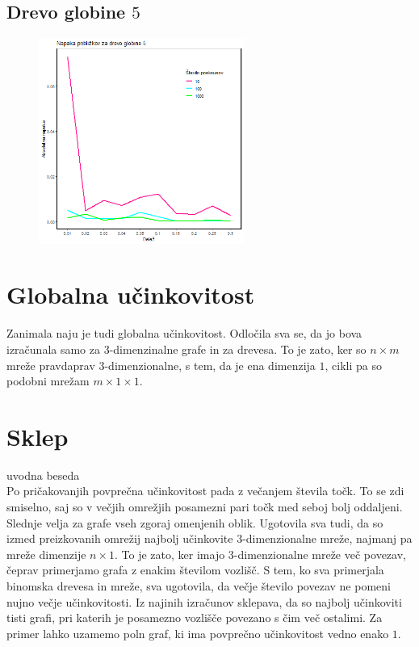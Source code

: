 \documentclass[a4paper, 16pt]{article}
\begin{document}
\newpage    
    \subsection{Drevo globine $5$}
    \begin{figure}[!h]
        \centering
        \includegraphics[width = 0.6\textwidth]{../Vizualizacija/Tree_5.png}
        \label{fig: tree}
    \end{figure}


    


\section{Globalna učinkovitost}

Zanimala naju je tudi globalna učinkovitost. Odločila sva se, da jo bova izračunala samo za 3-dimenzinalne grafe in za drevesa.
To je zato, ker so $n \times m$ mreže pravdaprav 3-dimenzionalne, s tem, da je ena dimenzija $1$, cikli pa so podobni mrežam $m \times 1 \times 1$.

\section{Sklep}
uvodna beseda\\
Po pričakovanjih povprečna učinkovitost pada z večanjem števila točk.
To se zdi smiselno, saj so v večjih omrežjih posamezni pari točk med seboj bolj oddaljeni.
Slednje velja za grafe vseh zgoraj omenjenih oblik. 
Ugotovila sva tudi, da so izmed preizkovanih omrežij najbolj učinkovite 3-dimenzionalne mreže, 
najmanj pa mreže dimenzije $n \times 1$. To je zato, ker imajo 3-dimenzionalne mreže več povezav, čeprav primerjamo grafa z enakim številom vozlišč.
S tem, ko sva primerjala binomska drevesa in mreže, sva ugotovila, da večje število povezav ne pomeni nujno večje učinkovitosti. 
Iz najinih izračunov sklepava, da so najbolj učinkoviti tisti grafi, pri katerih je posamezno vozlišče povezano s čim več ostalimi. 
Za primer lahko uzamemo poln graf, ki ima povprečno učinkovitost vedno enako $1$.
\end{document}
